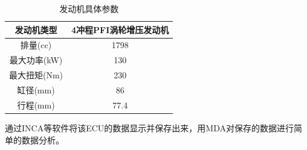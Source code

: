 \begin{table}[ht]
	\centering
	\caption{发动机具体参数}
	\label{tab:ice}
	\begin{tabular}{c|c}
		\hline
		发动机类型 & 4冲程PFI涡轮增压发动机 \\\hline
		排量(cc) & 1798 \\\hline
		最大功率(kW) & 130 \\\hline
		最大扭矩(Nm) & 230 \\\hline
		缸径(mm) & 86 \\\hline
		行程(mm) & 77.4 \\\hline
	\end{tabular}
\end{table}
\par 通过INCA等软件将该ECU的数据显示并保存出来，用MDA对保存的数据进行简单的数据分析。

